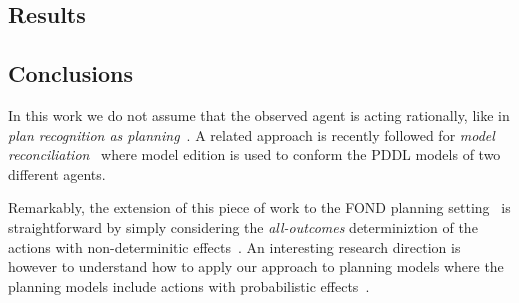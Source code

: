 \documentclass[letterpaper]{article} %
\begin{document}
\subsection{Results}

\subsection{Conclusions}
\label{sec:conclussions}
In this work we do not assume that the observed agent is acting rationally, like in {\em plan recognition as planning}~\cite{ramirez2012plan,ramirez2009plan}. A related approach is recently followed for {\em model reconciliation}~\cite{Kambhampati:mreconciliation:ijcai17} where model edition is used to conform the PDDL models of two different agents.

Remarkably, the extension of this piece of work to the FOND planning setting~\cite{muise2012improved} is straightforward by simply considering the {\em all-outcomes} determiniztion of the actions with non-determinitic effects~\cite{yoon2007ff}. An interesting research direction is however to understand how to apply our approach to planning models where the planning models include actions with probabilistic effects~\cite{younes2005first}.  



\end{document}

